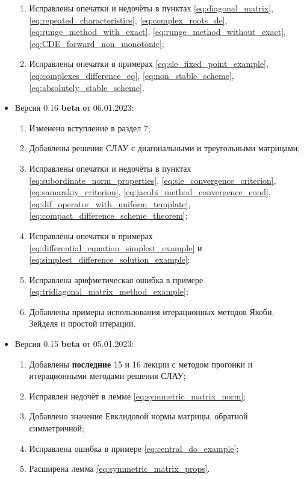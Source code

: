 \documentclass{article}
\begin{document}
\begin{itemize}[nosep]
\begin{enumerate}[nosep]
		\item Исправлены опечатки и недочёты в пунктах
			\eqref{eq:diagonal_matrix},
			\eqref{eq:repeated_characteristics},
			\eqref{eq:complex_roots_de},
			\eqref{eq:runge_method_with_exact},
			\eqref{eq:runge_method_without_exact},
			\eqref{eq:CDE_forward_non_monotonic};
		\item Исправлены опечатки в примерах
			\eqref{eq:sle_fixed_point_example},
			\eqref{eq:complexes_difference_eq},
			\eqref{eq:non_stable_scheme},
			\eqref{eq:absolutely_stable_scheme}.
	\end{enumerate}
\item Версия 0.16 \textbf{beta} от 06.01.2023:
	\begin{enumerate}[nosep]
		\item Изменено вступление в раздел 7;
		\item Добавлены решения СЛАУ с диагональными и треугольными
			матрицами;
		\item Исправлены опечатки и недочёты в пунктах
			\eqref{eq:subordinate_norm_properties},
			\eqref{eq:sle_convergence_criterion},
			\eqref{eq:samarskiy_criterion},
			\eqref{eq:jacobi_method_convergence_cond},
			\eqref{eq:dif_operator_with_uniform_template},
			\eqref{eq:compact_difference_scheme_theorem};
		\item Исправлены опечатки в примерах
			\eqref{eq:differential_equation_simplest_example} и
			\eqref{eq:simplest_difference_solution_example};
		\item Исправлена арифметическая ошибка в примере
			\eqref{eq:tridiagonal_matrix_method_example};
		\item Добавлены примеры использования итерационных методов
			Якоби, Зейделя и простой итерации.
	\end{enumerate}
\item Версия 0.15 \textbf{beta} от 05.01.2023:
	\begin{enumerate}[nosep]
		\item Добавлены \textbf{последние} 15 и 16 лекции с методом
			прогонки и итерационными методами решения СЛАУ;
		\item Исправлен недочёт в лемме
			\eqref{eq:symmetric_matrix_norm};
		\item Добавлено значение Евклидовой нормы матрицы, обратной
			симметричной;
		\item Исправлена ошибка в примере \eqref{eq:central_do_example};
		\item Расширена лемма \eqref{eq:symmetric_matrix_props}.
	\end{enumerate}

\end{itemize}
\end{document}
